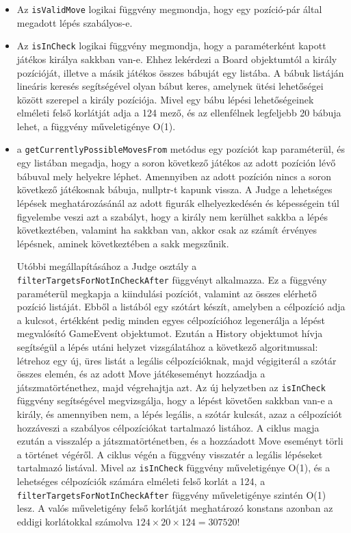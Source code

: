 \documentclass[12pt, twoside]{report}
\begin{document}
\begin{itemize}
	\item Az {\tt isValidMove} logikai függvény megmondja, hogy egy pozíció-pár által megadott lépés szabályos-e.
	
	\item Az {\tt isInCheck} logikai függvény megmondja, hogy a paraméterként kapott játékos királya sakkban van-e. Ehhez lekérdezi a Board objektumtól a király pozícióját, illetve a másik játékos összes bábuját egy listába. A bábuk listáján lineáris keresés segítségével olyan bábut keres, amelynek ütési lehetőségei között szerepel a király pozíciója. Mivel egy bábu lépési lehetőségeinek elméleti felső korlátját adja a 124 mező, és az ellenfélnek legfeljebb 20 bábuja lehet, a függvény műveletigénye O(1).
	
	\item a {\tt getCurrentlyPossibleMovesFrom} metódus egy pozíciót kap paraméterül,  és egy listában megadja, hogy a soron következő játékos az adott pozíción lévő bábuval mely helyekre léphet. Amennyiben az adott pozíción nincs a soron következő játékosnak bábuja, nullptr-t kapunk vissza. A Judge a lehetséges lépések meghatározásánál az adott figurák elhelyezkedésén és képességein túl figyelembe veszi azt a szabályt, hogy a király nem kerülhet sakkba a lépés következtében, valamint ha sakkban van, akkor csak az számít érvényes lépésnek, aminek következtében a sakk megszűnik.
	
	Utóbbi megállapításához a Judge osztály a {\tt filterTargetsForNotInCheckAfter} függvényt alkalmazza. Ez a függvény paraméterül megkapja a kiindulási pozíciót, valamint az összes elérhető pozíció listáját. Ebből a listából egy szótárt készít, amelyben a célpozíció adja a kulcsot, értékként pedig minden egyes célpozícióhoz legenerálja a lépést megvalósító GameEvent objektumot. Ezután a History objektumot hívja segítségül a lépés utáni helyzet vizsgálatához a következő algoritmussal: létrehoz egy új, üres listát a legális célpozícióknak, majd végigiterál a szótár összes elemén, és az adott Move játékeseményt hozzáadja a játszmatörténethez, majd végrehajtja azt. Az új helyzetben az {\tt isInCheck} függvény segítségével megvizsgálja, hogy a lépést követően sakkban van-e a király, és amennyiben nem, a lépés legális, a szótár kulcsát, azaz a célpozíciót hozzáveszi a szabályos célpozíciókat tartalmazó listához. A ciklus magja ezután a visszalép a játszmatörténetben, és a hozzáadott Move eseményt törli a történet végéről. A ciklus végén a függvény visszatér a legális lépéseket tartalmazó listával. Mivel az {\tt isInCheck} függvény műveletigénye O(1), és a lehetséges célpozíciók számára elméleti felső korlát a 124, a {\tt filterTargetsForNotInCheckAfter} függvény műveletigénye szintén O(1) lesz. A valós műveletigény felső korlátját meghatározó konstans azonban az eddigi korlátokkal számolva $124 \times 20 \times 124 = 307520$!


\end{itemize}
\end{document}
